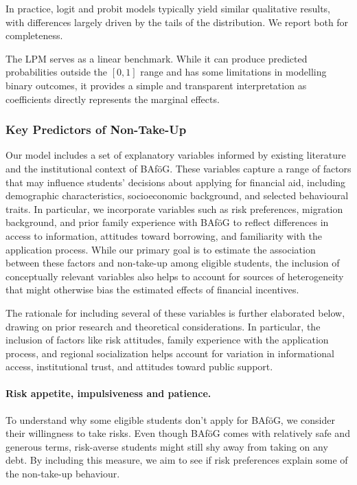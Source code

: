 In practice, logit and probit models typically yield similar qualitative results, with differences largely driven by the tails of the distribution. We report both for completeness.

The LPM serves as a linear benchmark. 
While it can produce predicted probabilities outside the \([0,1]\) range and has some limitations in modelling binary outcomes, it provides a simple and transparent interpretation as coefficients directly represents the marginal effects.

\subsubsection{Key Predictors of Non-Take-Up}
Our model includes a set of explanatory variables informed by existing literature and the institutional context of BAföG. 
These variables capture a range of factors that may influence students' decisions about applying for financial aid, including demographic characteristics, socioeconomic background, and selected behavioural traits. 
In particular, we incorporate variables such as risk preferences, migration background, and prior family experience with BAföG to reflect differences in access to information, attitudes toward borrowing, and familiarity with the application process. 
While our primary goal is to estimate the association between these factors and non-take-up among eligible students, the inclusion of conceptually relevant variables also helps to account for sources of heterogeneity that might otherwise bias the estimated effects of financial incentives.

The rationale for including several of these variables is further elaborated below, drawing on prior research and theoretical considerations. In particular, the inclusion of factors like risk attitudes, family experience with the application process, and regional socialization helps account for variation in informational access, institutional trust, and attitudes toward public support.

\paragraph{Risk appetite, impulsiveness and patience.}  
To understand why some eligible students don’t apply for BAföG, we consider their willingness to take risks.  
Even though BAföG comes with relatively safe and generous terms, risk-averse students might still shy away from taking on any debt.  
By including this measure, we aim to see if risk preferences explain some of the non-take-up behaviour.  

